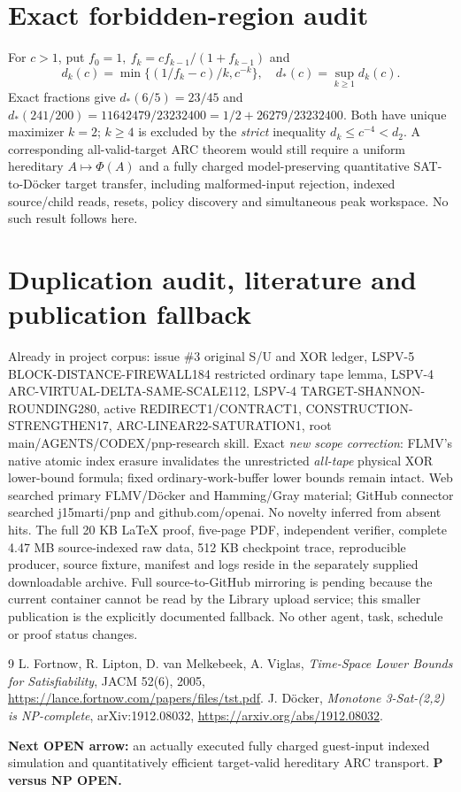 \documentclass[10pt]{article}
\begin{document}
\section{Exact forbidden-region audit}
For \(c>1\), put \(f_0=1,\ f_k=cf_{k-1}/(1+f_{k-1})\) and
\[
d_k(c)=\min\{(1/f_k-c)/k,c^{-k}\},\quad d_*(c)=\sup_{k\ge1}d_k(c).
\]
Exact fractions give \(d_*(6/5)=23/45\) and
\(d_*(241/200)=11642479/23232400=1/2+26279/23232400\).
Both have unique maximizer \(k=2\); \(k\ge4\) is excluded by the \emph{strict} inequality \(d_k\le c^{-4}<d_2\). A corresponding all-valid-target ARC theorem would still require a uniform hereditary \(A\mapsto\Phi(A)\) and a fully charged model-preserving quantitative SAT-to-D\"ocker target transfer, including malformed-input rejection, indexed source/child reads, resets, policy discovery and simultaneous peak workspace. No such result follows here.
\section{Duplication audit, literature and publication fallback}
Already in project corpus: issue \#3 original S/U and XOR ledger, LSPV-5 BLOCK-DISTANCE-FIREWALL184 restricted ordinary tape lemma, LSPV-4 ARC-VIRTUAL-DELTA-SAME-SCALE112, LSPV-4 TARGET-SHANNON-ROUNDING280, active REDIRECT1/CONTRACT1, CONSTRUCTION-STRENGTHEN17, ARC-LINEAR22-SATURATION1, root main/AGENTS/CODEX/pnp-research skill. Exact \emph{new scope correction}: FLMV's native atomic index erasure invalidates the unrestricted \emph{all-tape} physical XOR lower-bound formula; fixed ordinary-work-buffer lower bounds remain intact. Web searched primary FLMV/D\"ocker and Hamming/Gray material; GitHub connector searched j15marti/pnp and github.com/openai. No novelty inferred from absent hits. The full 20 KB LaTeX proof, five-page PDF, independent verifier, complete 4.47 MB source-indexed raw data, 512 KB checkpoint trace, reproducible producer, source fixture, manifest and logs reside in the separately supplied downloadable archive. Full source-to-GitHub mirroring is pending because the current container cannot be read by the Library upload service; this smaller publication is the explicitly documented fallback. No other agent, task, schedule or proof status changes.
\begin{thebibliography}{9}
 L. Fortnow, R. Lipton, D. van Melkebeek, A. Viglas, \emph{Time-Space Lower Bounds for Satisfiability}, JACM 52(6), 2005, \url{https://lance.fortnow.com/papers/files/tst.pdf}.
 J. D\"ocker, \emph{Monotone 3-Sat-(2,2) is NP-complete}, arXiv:1912.08032, \url{https://arxiv.org/abs/1912.08032}.
\end{thebibliography}
\noindent \textbf{Next OPEN arrow:} an actually executed fully charged guest-input indexed simulation and quantitatively efficient target-valid hereditary ARC transport. \textbf{P versus NP OPEN.}
\end{document}
